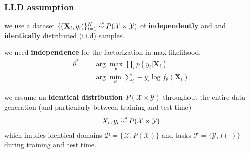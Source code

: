 \documentclass[11pt]{beamer}
\begin{document}
	
	\begin{frame}
		\frametitle{I.I.D assumption}
		
		we use a dataset $\{(\mathbf{X}_i,y_i)\}_{i=1}^N \iidsim P(\mathcal{X} \times \mathcal{Y})$ of \textbf{independently} and and \textbf{identically} distributed (i.i.d) samples.
		\vspace{1em}
		
		\pause
		we need \textbf{independence} for the factorization in max likelihood.
		\begin{align*}
		\theta^\ast &= \arg\max_\theta \prod_{i} p(y_i \vert \mathbf{X}_i)  \\
		&= \arg\min_\theta \sum_{i} -y_i \log f_\theta(\mathbf{X}_i)
		\end{align*}
		
		\pause
		we assume an \textbf{identical distribution} $P(\mathcal{X} \times \mathcal{Y})$ throughout the entire data generation { \scriptsize (and particularly between training and test time) }
		\begin{align}
		X_i,y_i \iidsim P(\mathcal{X} \times \mathcal{Y})
		\end{align}
		which implies identical domains $\mathcal{D} = \{\mathcal{X}, P(\mathcal{X})\}$ and tasks $\mathcal{T} = \{\mathcal{Y}, f(\cdot)\}$ during training and test time.
		
	\end{frame}
\end{document}
